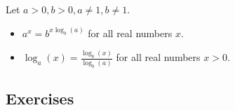\begin{theorem}
    Let $a>0, b>0, a \neq 1, b \neq 1$.
    \begin{itemize}
        \item $a^x = b^{x \log_{b}(a)}$ for all real numbers $x$.
        \item $\log_{a}(x) = \frac{\log_{b}(x)}{\log_{b}(a)}$ for all real numbers $x>0$.
    \end{itemize}
\end{theorem}

\subsection{Exercises}
